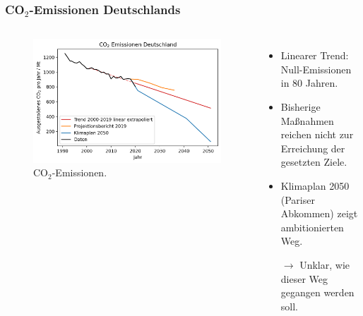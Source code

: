 \begin{frame}
  \frametitle{CO$_2$-Emissionen Deutschlands}
  \begin{columns}
      \begin{figure}
		    \centering
		    \includegraphics[width=\linewidth]{bilder/co2-emissions-de.png}
		    \caption{CO$_2$-Emissionen.}
      \end{figure}
      \begin{itemize}
        \item Linearer Trend: Null-Emissionen in 80 Jahren.
        \item Bisherige Maßnahmen reichen nicht zur Erreichung der gesetzten Ziele.
        \item Klimaplan 2050 (Pariser Abkommen) zeigt ambitionierten Weg.
        \item[$\rightarrow$] Unklar, wie dieser Weg gegangen werden soll.
      \end{itemize}
    \end{columns}
\end{frame}

